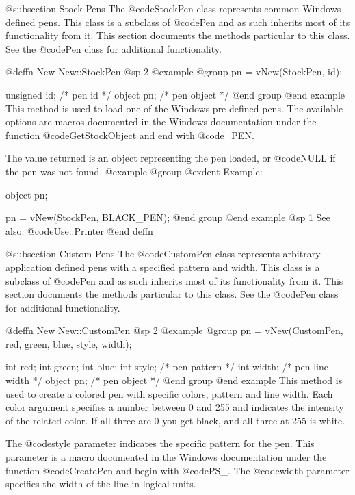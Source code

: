 @subsection Stock Pens
The @code{StockPen} class represents common Windows defined pens.  This
class is a subclass of @code{Pen} and as such inherits most of its
functionality from it.  This section documents the methods particular to
this class.  See the @code{Pen} class for additional functionality.






@deffn {New} New::StockPen
@sp 2
@example
@group
pn = vNew(StockPen, id);

unsigned id;    /*  pen id      */
object  pn;     /*  pen object  */
@end group
@end example
This method is used to load one of the Windows pre-defined pens.
The available options are macros documented in the Windows documentation
under the function @code{GetStockObject} and end with @code{_PEN}.

The value returned is an object representing the pen loaded, or
@code{NULL} if the pen was not found.
@example
@group
@exdent Example:

object  pn;

pn = vNew(StockPen, BLACK_PEN);
@end group
@end example
@sp 1
See also:  @code{Use::Printer}
@end deffn







@subsection Custom Pens
The @code{CustomPen} class represents arbitrary application defined pens
with a specified pattern and width.  This class is a subclass of
@code{Pen} and as such inherits most of its functionality from it.  This
section documents the methods particular to this class.  See the
@code{Pen} class for additional functionality.






@deffn {New} New::CustomPen
@sp 2
@example
@group
pn = vNew(CustomPen, red, green, blue, style, width);

int     red;
int     green;
int     blue;
int     style;  /*  pen pattern     */
int     width;  /*  pen line width  */
object  pn;     /*  pen object      */
@end group
@end example
This method is used to create a colored pen with specific colors,
pattern and line width.  Each color argument specifies a number between
0 and 255 and indicates the intensity of the related color.  If all
three are 0 you get black, and all three at 255 is white.

The @code{style} parameter indicates the specific pattern for the pen.
This parameter is a macro documented in the Windows documentation under
the function @code{CreatePen} and begin with @code{PS_}.
The @code{width} parameter specifies the width of the line in logical
units.

